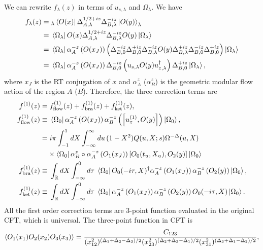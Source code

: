 \documentclass[a4paper,11pt]{article}
\theoremstyle{definition}
\begin{document}
We can rewrite $f_\lambda(z)$ in terms of $u_{s,\lambda}$ and $\Omega_\lambda$. We have
\begin{align}
    f_\lambda(z) =&\;_\lambda\bra{O(x)}\Delta_{A,\lambda}^{1/2+iz}\Delta_{B,\lambda}^{-iz}\ket{O(y)}_\lambda \\
    =&\;\bra{\Omega_\lambda}O(x) \Delta_{A,\lambda}^{1/2+iz}\Delta_{B,\lambda}^{-iz}O(y) \ket{\Omega_\lambda}\\
    =& \; \bra{ \Omega_\lambda} \alpha_{A}^{-z}\left(O(x_J)\right) \left( \Delta_{B,0}^{-iz}\Delta_{B,0}^{+iz} \Delta_{B,\lambda}^{-iz}O(y) \Delta_{B,\lambda}^{+iz}\Delta_{B,0}^{-iz}\Delta_{B,0}^{+iz}\right)\ket{\Omega_\lambda}\\
    =& \; \bra{\Omega_\lambda}\alpha_{A}^{-z}\left(O(x_J)\right) \Delta_{B,0}^{-iz}\left(u_{s,\lambda}O(y) u_{z,\lambda}^\dagger\right) \Delta_{B,0}^{+iz}\ket{\Omega_\lambda},
\end{align}
where $x_J$ is the RT conjugation of $x$ and $\alpha_{A}^{z}$ ($\alpha_{B}^{z}$) is the geometric modular flow action of the region $A$ ($B$). Therefore, the three correction terms are
\begin{align}
    f^{(1)}(z) =&\; f^{(1)}_{\text{flow}}(z) + f^{(1)}_{\text{bra}}(z) + f^{(1)}_{\text{ket}}(z),\\
    f^{(1)}_{\text{flow}}(z) \equiv&\; \bra{\Omega_0} \alpha_{A}^{-z}\left(O(x_J)\right) \alpha_{B}^{-z}\left(\left[u_{z}^{(1)},O(y)\right]\right) \ket{\Omega_0}, \\
    =&\; i\pi  \int_{-1}^1 dX \int_{-\infty}^{\infty} du \, (1-X^2)Q(u,X;s) \Omega^{-\Delta}(u,X) \nonumber\\
    &\times\bra{\Omega_0} \alpha_{B}^{z} \circ \alpha_{A}^{-z}\left(O_1(x_J)\right) \left[O_0(t_u,X_u),O_2(y)\right] \ket{\Omega_0} \\
    f^{(1)}_{\text{bra}}(z) \equiv&\; \int_\mathbb{R} dX \int_{-\infty}^{0} d\tau \; \bra{\Omega_0} O_0(-i\tau,X)^\dagger  \alpha_{A}^{-z}\left(O_1(x_J)\right) \alpha_{B}^{-z}\left(O_2(y)\right) \ket{\Omega_0},\\
    f^{(1)}_{\text{ket}}(z) \equiv&\; \int_\mathbb{R} dX \int_{-\infty}^{0} d\tau \; \bra{\Omega_0} \alpha_{A}^{-z}\left(O_1(x_J)\right) \alpha_{B}^{-z}\left(O_2(y)\right) O_0(-i\tau,X) \ket{\Omega_0}.
\end{align}
All the first order correction terms are 3-point function evaluated in the original CFT, which is universal. The three-point function in CFT is \cite{}
\begin{align}
    \braket{O_1(x_1) O_2(x_2) O_3(x_3)} = \frac{C_{123}}{(x_{12}^2)^{(\Delta_1+\Delta_2-\Delta_3)/2}(x_{23}^2)^{(\Delta_2+\Delta_3-\Delta_1)/2}(x_{31}^2)^{(\Delta_3+\Delta_1-\Delta_2)/2}},    
\end{align}
\end{document}
